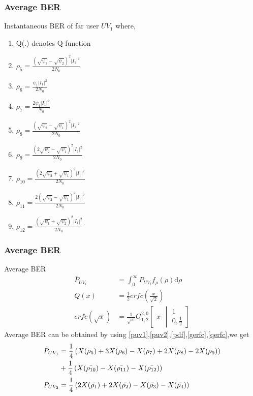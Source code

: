 \documentclass{beamer}
\providecommand{\sbrak}[1]{\ensuremath{{}\left[#1\right]}}
\providecommand{\brak}[1]{\ensuremath{\left(#1\right)}}
\begin{document}
\begin{frame}
\frametitle{Average BER}
\begin{block}{Instantaneous BER of far user $UV_1$}
where,
\begin{enumerate}
\item  Q(.) denotes Q-function
\item  $\rho_5= \frac{(\sqrt{\psi_1}-\sqrt{\psi_2})^2|I_1|^2}{2N_0}$
\item  $\rho_6= \frac{\psi_1|I_1|^2}{2N_0}$
\item  $\rho_7= \frac{2\psi_1|I_1|^2}{N_0}$
\item  $\rho_8= \frac{(\sqrt{\psi_2}-\sqrt{\psi_1})^2|I_1|^2}{2N_0}$
\item  $\rho_9= \frac{(2\sqrt{\psi_2}-\sqrt{\psi_1})^2|I_1|^2}{2N_0}$
\item  $\rho_{10}= \frac{(2\sqrt{\psi_2}+\sqrt{\psi_1})^2|I_1|^2}{2N_0}$
\item  $\rho_{11}= \frac{2(\sqrt{\psi_2}-\sqrt{\psi_1})^2|I_1|^2}{2N_0}$
\item  $\rho_{12}= \frac{(\sqrt{\psi_1}+\sqrt{\psi_2})^2|I_1|^2}{2N_0}$
\end{enumerate}
\end{block}
\end{frame}


\begin{frame}
\frametitle{Average BER}
\begin{block}{Average BER}
\begin{align}
\bar{P}_{UV_i} &= \int_0^\infty P_{UV_i}f_{\rho}(\rho) \mathrm{d}\rho \label{avgb} \\
Q(x) &= \frac{1}{2}erfc(\frac{x}{\sqrt{2}}) \label{qerfc} \\
erfc(\sqrt{x}) &= \frac{1}{\sqrt{\pi}} G^{2,0}_{1,2} \sbrak{\begin{array}{c}
x 
\end{array} \middle \vert
\begin{array}{c}
1 \\
0,\frac{1}{2}
\end{array} } \label{gerfc}
\end{align}
Average BER can be obtained by using \eqref{puv1},\eqref{puv2},\eqref{pdf},\eqref{gerfc},\eqref{qerfc},we get
\begin{align}
\bar{P}_{UV_1} &= \frac{1}{4} \brak{ X(\bar{\rho_5}) +3 X(\bar{\rho_6}) - X(\bar{\rho_7}) +2 X(\bar{\rho_8}) -2 X(\bar{\rho_9}) } \notag \\
&+\frac{1}{4} \brak{  X(\bar{\rho_{10}}) - X(\bar{\rho_{11}})- X(\bar{\rho_{12}})}  \label{apuv1} \\
\bar{P}_{UV_2} &= \frac{1}{4} \brak{ 2X(\bar{\rho_1}) + 2 X(\bar{\rho_2})- X(\bar{\rho_3})-  X(\bar{\rho_4})} \label{apuv2}
\end{align}
\end{block}
\end{frame}
\end{document}
